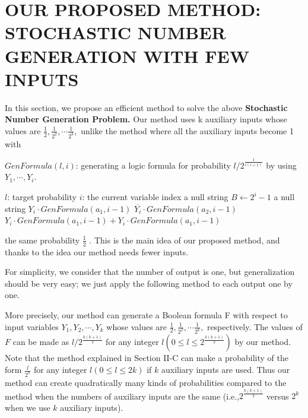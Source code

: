 \documentclass[10pt,conference]{IEEEtran}
\begin{document}
\section{ OUR PROPOSED METHOD: STOCHASTIC NUMBER GENERATION WITH FEW INPUTS}
\par
In this section, we propose an efficient method to solve the
above \textbf {Stochastic Number Generation Problem.} Our method
uses k auxiliary inputs whose values are $\frac{1}{2},\frac{1}{2^2}, \cdots \frac{1}{2^k}, $ unlike the method \cite{fifteen} where all the auxiliary inputs become 1 with
\begin{algorithm}
    \caption {$GenFormula(l, i)$: generating a logic formula
    for probability $l/{2^\frac{1}{i(i+1)}}$ by using $Y_1, \cdots , Y_i$.
    }
    \begin{algorithmic}[1]
    \Require
      \Statex $l$: target probability
    \Require
        \Statex$i$: the current variable index
    \State \Return a null string
    \Else  \State $B \gets 2^i-1$
    \State \Return a null string
    \EndIf
    \State \Return $Y_i \cdot GenFormula(a_1, i - 1)$
    \EndIf
    \State \Return $\overline{Y_i} \cdot GenFormula(a_2, i - 1)$
    \EndIf
    \State \Return $Y_i \cdot GenFormula(a_1, i - 1) + Y_i \cdot GenFormula(a_1, i - 1)$
    \EndIf
    \EndIf
  \end{algorithmic}
\end{algorithm}
the same probability $\frac{1}{2}$ . This is the main idea of our proposed
method, and thanks to the idea our method needs fewer inputs.

\par
For simplicity, we consider that the number of output is
one, but generalization should be very easy; we just apply the
following method to each output one by one.

\par
More precisely, our method can generate a Boolean formula
F with respect to input variables $Y_1, Y_2, \cdots , Y_k$ whose values
are $\frac{1}{2},\frac{1}{2^2}, \cdots \frac{1}{2^k},$ respectively. The values of $F$ can be made
as $l/2^{\frac{k(k+1)}{2}}$ for any integer $l (0 \leq l \leq 2^{\frac{k(k+1)}{2}})$ by our method. Note that the method \cite{fifteen} explained in Section II-C can make
a probability of the form $\frac{l}{2^k}$ for any integer $l (0 \leq l \leq 2k)$
if $k$ auxiliary inputs are used. Thus our method can create
quadratically many kinds of probabilities compared to the
method \cite{fifteen} when the numbers of auxiliary inputs are the
same (i.e.,$2^{\frac{k(k+1)}{2}}$ versus $2^k$ when we use $k$ auxiliary inputs).
\end{document}
